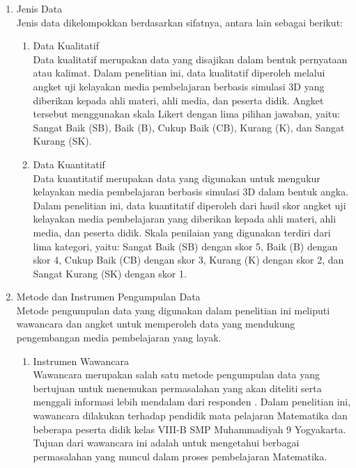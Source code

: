 \begin{enumerate}
    \item Jenis Data\\
    \hspace*{1cm}Jenis data dikelompokkan berdasarkan sifatnya, antara lain sebagai berikut:
    \begin{enumerate}
        \item Data Kualitatif\\
        \hspace*{1cm}Data kualitatif merupakan data yang disajikan dalam bentuk pernyataan atau kalimat. Dalam penelitian ini, data kualitatif diperoleh melalui angket uji kelayakan media pembelajaran berbasis simulasi 3D yang diberikan kepada ahli materi, ahli media, dan peserta didik. Angket tersebut menggunakan skala Likert dengan lima pilihan jawaban, yaitu: Sangat Baik (SB), Baik (B), Cukup Baik (CB), Kurang (K), dan Sangat Kurang (SK).
        \item Data Kuantitatif\\
        \hspace*{1cm}Data kuantitatif merupakan data yang digunakan untuk mengukur kelayakan media pembelajaran berbasis simulasi 3D dalam bentuk angka. Dalam penelitian ini, data kuantitatif diperoleh dari hasil skor angket uji kelayakan media pembelajaran yang diberikan kepada ahli materi, ahli media, dan peserta didik. Skala penilaian yang digunakan terdiri dari lima kategori, yaitu: Sangat Baik (SB) dengan skor 5, Baik (B) dengan skor 4, Cukup Baik (CB) dengan skor 3, Kurang (K) dengan skor 2, dan Sangat Kurang (SK) dengan skor 1.
    \end{enumerate}
    \item Metode dan Instrumen Pengumpulan Data\\
    \hspace*{1cm}Metode pengumpulan data yang digunakan dalam penelitian ini meliputi wawancara dan angket untuk memperoleh data yang mendukung pengembangan media pembelajaran yang layak.
    \begin{enumerate}
        \item Instrumen Wawancara\\
        \hspace*{1cm}Wawancara merupakan salah satu metode pengumpulan data yang bertujuan untuk menemukan permasalahan yang akan diteliti serta menggali informasi lebih mendalam dari responden \citep{sugiyono2018}. Dalam penelitian ini, wawancara dilakukan terhadap pendidik mata pelajaran Matematika dan beberapa peserta didik kelas VIII-B SMP Muhammadiyah 9 Yogyakarta. Tujuan dari wawancara ini adalah untuk mengetahui berbagai permasalahan yang muncul dalam proses pembelajaran Matematika.

\end{enumerate}
\end{enumerate}
